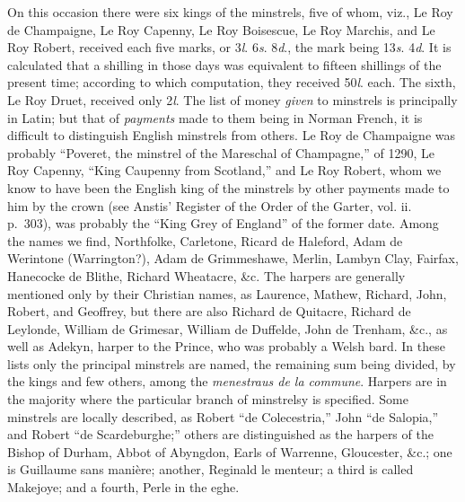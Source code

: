 On this occasion there were six kings of the minstrels, five of whom, viz.,
Le Roy de Champaigne, Le Roy Capenny, Le Roy Boisescue, Le Roy Marchis,
and Le Roy Robert, received each five marks, or 3\textit{l}. 6\textit{s}. 8\textit{d}., the mark being
13\textit{s}. 4\textit{d}. It is calculated that a shilling in those days was equivalent to fifteen
shillings of the present time; according to which computation, they received 50\textit{l}.
each. The sixth, Le Roy Druet, received only 2\textit{l}. The list of money \textit{given} to
minstrels is principally in Latin; but that of \textit{payments} made to them being in
Norman French, it is difficult to distinguish English minstrels from others. Le
Roy de Champaigne was probably “Poveret, the minstrel of the Mareschal of
Champagne,” of 1290, Le Roy Capenny, “King Caupenny from Scotland,” and
Le Roy Robert, whom we know to have been the English king of the minstrels
by other payments made to him by the crown (see Anstis’ Register of the Order
of the Garter, vol. ii. p.~303), was probably the “King Grey of England” of
the former date. Among the names we find, Northfolke, Carletone, Ricard de
Haleford, Adam de Werintone (Warrington?), Adam de Grimmeshawe, Merlin,
Lambyn Clay, Fairfax, Hanecocke de Blithe, Richard Wheatacre, \&c. The
harpers are generally mentioned only by their Christian names, as Laurence,
Mathew, Richard, John, Robert, and Geoffrey, but there are also Richard de
Quitacre, Richard de Leylonde, William de Grimesar, William de Duffelde, John
de Trenham, \&c., as well as Adekyn, harper to the Prince, who was probably
a Welsh bard. In these lists only the principal minstrels are named, the remaining
sum being divided, by the kings and few others, among the \textit{menestraus de la
commune}. Harpers are in the majority where the particular branch of minstrelsy
is specified. Some minstrels are locally described, as Robert “de Colecestria,”
John “de Salopia,” and Robert “de Scardeburghe;” others are distinguished
as the harpers of the Bishop of Durham, Abbot of Abyngdon, Earls of Warrenne,
Gloucester, \&c.; one is Guillaume sans manière; another, Reginald le menteur;
a third is called Makejoye; and a fourth, Perle in the eghe. 
\pagebreak


